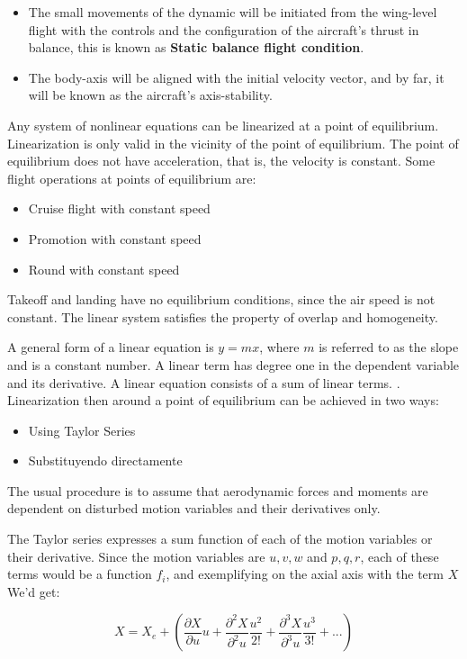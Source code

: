 \begin{itemize}
    \item The small movements of the dynamic will be initiated from the wing-level flight with the controls and the configuration of the aircraft's thrust in balance, this is known as \textbf{Static balance flight condition}.
    \item The body-axis will be aligned with the initial velocity vector, and by far, it will be known as the aircraft's axis-stability.
\end{itemize}

Any system of nonlinear equations can be linearized at a point of equilibrium. Linearization is only valid in the vicinity of the point of equilibrium. The point of equilibrium does not have acceleration, that is, the velocity is constant. Some flight operations at points of equilibrium are: 
\begin{itemize}
    \item Cruise flight with constant speed
    \item Promotion with constant speed
    \item Round with constant speed
\end{itemize}

Takeoff and landing have no equilibrium conditions, since the air speed is not constant. The linear system satisfies the property of overlap and homogeneity. 

A general form of a linear equation is $y=mx$, where $m$ is referred to as the slope and is a constant number. A linear term has degree one in the dependent variable and its derivative. A linear equation consists of a sum of linear terms. \cite{Mohammad2020}. Linearization then around a point of equilibrium can be achieved in two ways:
\begin{itemize}
    \item Using Taylor Series
    \item Substituyendo directamente
\end{itemize}

The usual procedure is to assume that aerodynamic forces and moments are dependent on disturbed motion variables and their derivatives only.  

The Taylor series expresses a sum function of each of the motion variables or their derivative. Since the motion variables are $u,v,w$ and $p,q,r$, each of these terms would be a function $f_i$, and exemplifying on the axial axis with the term $X$ We'd get: 

\begin{equation}
    X = X_{e} + (\frac{\partial X}{\partial u}u+\frac{\partial^2 X}{\partial^2 u}\frac{u^2}{2!}+\frac{\partial^3 X}{\partial^3 u}\frac{u^3}{3!} + ...)
\end{equation}


